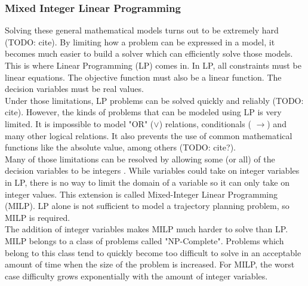 \subsubsection{Mixed Integer Linear Programming}
Solving these general mathematical models turns out to be extremely hard (TODO: cite). By limiting how a problem can be expressed in a model, it becomes much easier to build a solver which can efficiently solve those models. This is where Linear Programming (LP) comes in. In LP, all constraints must be linear equations. The objective function must also be a linear function. The decision variables must be real values. \\
Under those limitations, LP problems can be solved quickly and reliably (TODO: cite). However, the kinds of problems that can be modeled using LP is very limited. It is impossible to model "OR" ($\vee$) relations, conditionals ( $\rightarrow$) and many other logical relations. It also prevents the use of common mathematical functions like the absolute value, among others (TODO: cite?). \\
Many of those limitations can be resolved by allowing some (or all) of the decision variables to be integers \cite{Mitra1994}. While variables could take on integer variables in LP, there is no way to limit the domain of a variable so it can only take on integer values. This extension is called Mixed-Integer Linear Programming (MILP). LP alone is not sufficient to model a trajectory planning problem, so MILP is required.\\
The addition of integer variables makes MILP much harder to solve than LP. MILP belongs to a class of problems called "NP-Complete". Problems which belong to this class tend to quickly become too difficult to solve in an acceptable amount of time when the size of the problem is increased. For MILP, the worst case difficulty grows exponentially with the amount of integer variables.
